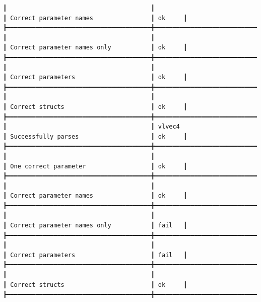 \documentclass[12pt,twoside,notitlepage]{report}
\begin{document}
\begin{listing}[H]
{\begin{verbatim}
┃                                        ┃                                        ┃ Correct parameter names                ┃ ok     ┃
┣━━━━━━━━━━━━━━━━━━━━━━━━━━━━━━━━━━━━━━━━╋━━━━━━━━━━━━━━━━━━━━━━━━━━━━━━━━━━━━━━━━╋━━━━━━━━━━━━━━━━━━━━━━━━━━━━━━━━━━━━━━━━╋━━━━━━━━┫
┃                                        ┃                                        ┃ Correct parameter names only           ┃ ok     ┃
┣━━━━━━━━━━━━━━━━━━━━━━━━━━━━━━━━━━━━━━━━╋━━━━━━━━━━━━━━━━━━━━━━━━━━━━━━━━━━━━━━━━╋━━━━━━━━━━━━━━━━━━━━━━━━━━━━━━━━━━━━━━━━╋━━━━━━━━┫
┃                                        ┃                                        ┃ Correct parameters                     ┃ ok     ┃
┣━━━━━━━━━━━━━━━━━━━━━━━━━━━━━━━━━━━━━━━━╋━━━━━━━━━━━━━━━━━━━━━━━━━━━━━━━━━━━━━━━━╋━━━━━━━━━━━━━━━━━━━━━━━━━━━━━━━━━━━━━━━━╋━━━━━━━━┫
┃                                        ┃                                        ┃ Correct structs                        ┃ ok     ┃
┣━━━━━━━━━━━━━━━━━━━━━━━━━━━━━━━━━━━━━━━━╋━━━━━━━━━━━━━━━━━━━━━━━━━━━━━━━━━━━━━━━━╋━━━━━━━━━━━━━━━━━━━━━━━━━━━━━━━━━━━━━━━━╋━━━━━━━━┫
┃                                        ┃ vlvec4                                 ┃ Successfully parses                    ┃ ok     ┃
┣━━━━━━━━━━━━━━━━━━━━━━━━━━━━━━━━━━━━━━━━╋━━━━━━━━━━━━━━━━━━━━━━━━━━━━━━━━━━━━━━━━╋━━━━━━━━━━━━━━━━━━━━━━━━━━━━━━━━━━━━━━━━╋━━━━━━━━┫
┃                                        ┃                                        ┃ One correct parameter                  ┃ ok     ┃
┣━━━━━━━━━━━━━━━━━━━━━━━━━━━━━━━━━━━━━━━━╋━━━━━━━━━━━━━━━━━━━━━━━━━━━━━━━━━━━━━━━━╋━━━━━━━━━━━━━━━━━━━━━━━━━━━━━━━━━━━━━━━━╋━━━━━━━━┫
┃                                        ┃                                        ┃ Correct parameter names                ┃ ok     ┃
┣━━━━━━━━━━━━━━━━━━━━━━━━━━━━━━━━━━━━━━━━╋━━━━━━━━━━━━━━━━━━━━━━━━━━━━━━━━━━━━━━━━╋━━━━━━━━━━━━━━━━━━━━━━━━━━━━━━━━━━━━━━━━╋━━━━━━━━┫
┃                                        ┃                                        ┃ Correct parameter names only           ┃ fail   ┃
┣━━━━━━━━━━━━━━━━━━━━━━━━━━━━━━━━━━━━━━━━╋━━━━━━━━━━━━━━━━━━━━━━━━━━━━━━━━━━━━━━━━╋━━━━━━━━━━━━━━━━━━━━━━━━━━━━━━━━━━━━━━━━╋━━━━━━━━┫
┃                                        ┃                                        ┃ Correct parameters                     ┃ fail   ┃
┣━━━━━━━━━━━━━━━━━━━━━━━━━━━━━━━━━━━━━━━━╋━━━━━━━━━━━━━━━━━━━━━━━━━━━━━━━━━━━━━━━━╋━━━━━━━━━━━━━━━━━━━━━━━━━━━━━━━━━━━━━━━━╋━━━━━━━━┫
┃                                        ┃                                        ┃ Correct structs                        ┃ ok     ┃
┣━━━━━━━━━━━━━━━━━━━━━━━━━━━━━━━━━━━━━━━━╋━━━━━━━━━━━━━━━━━━━━━━━━━━━━━━━━━━━━━━━━╋━━━━━━━━━━━━━━━━━━━━━━━━━━━━━━━━━━━━━━━━╋━━━━━━━━┫
\end{verbatim}
}
\caption{Sample of verbose test results\label{verbose}}
\end{listing}
\end{document}
